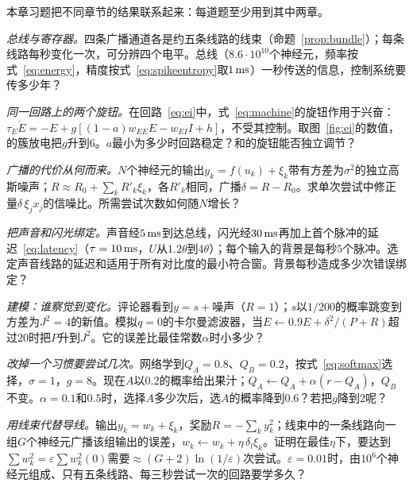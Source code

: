 本章习题把不同章节的结果联系起来：每道题至少用到其中两章。

\begin{exercise}[\lvlA]
\label{ex:10:1}
\emph{总线与寄存器。}四条广播通道各是约五条线路的线束（命题~\ref{prop:bundle}）；每条线路每秒变化一次，可分辨四个电平。总线（$8.6\cdot10^{10}$个神经元，频率按式~\eqref{eq:energy}，精度按式~\eqref{eq:spikeentropy}取$1\,\text{ms}$）一秒传送的信息，控制系统要传多少年？
\end{exercise}

\begin{exercise}[\lvlB]
\label{ex:10:2}
\emph{同一回路上的两个旋钮。}在回路~\eqref{eq:ei}中，式~\eqref{eq:machine}的旋钮作用于兴奋：$\tau_E\dot E=-E+g[(1-a)w_{EE}E-w_{EI}I+h]$，不受其控制。取图~\ref{fig:ei}的数值，的簇放电把$g$升到$6$。$a$最小为多少时回路稳定？和的旋钮能否独立调节？
\end{exercise}

\begin{exercise}[\lvlB]
\label{ex:10:3}
\emph{广播的代价从何而来。}$N$个神经元的输出$y_k=f(u_k)+\xi_k$带有方差为$\sigma^2$的独立高斯噪声；$R\approx R_0+\sum_kR'_k\xi_k$，各$R'_k$相同，广播$\delta=R-R_0$。求单次尝试中修正量$\delta\,\xi_jx_j$的信噪比。所需尝试次数如何随$N$增长？
\end{exercise}

\begin{exercise}[\lvlB]
\label{ex:10:4}
\emph{把声音和闪光绑定。}声音经$5\,\text{ms}$到达总线，闪光经$30\,\text{ms}$再加上首个脉冲的延迟~\eqref{eq:latency}（$\tau=10\,\text{ms}$，$U$从$1.2\theta$到$4\theta$）；每个输入的背景是每秒$5$个脉冲。选定声音线路的延迟和适用于所有对比度的最小符合窗。背景每秒造成多少次错误绑定？
\end{exercise}

\begin{exercise}[\lvlB]
\label{ex:10:5}
\emph{建模：谁察觉到变化。}评论器看到$y=s+\text{噪声}$（$R=1$）；$s$以$1/200$的概率跳变到方差为$J^2=4$的新值。模拟$q=0$的卡尔曼滤波器，当$E\leftarrow0.9E+\delta^2/(P+R)$超过$20$时把$P$升到$J^2$。它的误差比最佳常数$\alpha$时小多少？
\end{exercise}

\begin{exercise}[\lvlA]
\label{ex:10:6}
\emph{改掉一个习惯要尝试几次。}网络学到$Q_A=0.8$、$Q_B=0.2$，按式~\eqref{eq:softmax}选择，$\sigma=1$，$g=8$。现在$A$以$0.2$的概率给出果汁；$Q_A\leftarrow Q_A+\alpha(r-Q_A)$，$Q_B$不变。$\alpha=0.1$和$0.5$时，选择$A$多少次后，选$A$的概率降到$0.6$？若把$g$降到$2$呢？
\end{exercise}

\begin{exercise}[\lvlC]
\label{ex:10:7}
\emph{用线束代替导线。}输出$y_k=w_k+\xi_k$，奖励$R=-\sum_ky_k^2$；线束中的一条线路向一组$G$个神经元广播该组输出的误差，$w_k\leftarrow w_k+\eta\,\delta_l\xi_k$。证明在最佳$\eta$下，要达到$\sum w_k^2=\varepsilon\sum w_k^2(0)$需要$\approx(G+2)\ln(1/\varepsilon)$次尝试。$\varepsilon=0.01$时，由$10^6$个神经元组成、只有五条线路、每三秒尝试一次的回路要学多久？
\end{exercise}
